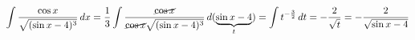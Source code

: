\documentclass[../rgr1.tex]{subfiles}
\begin{document}
\Solution

\begin{dmath}
	\int \frac{\cos x}{\sqrt{(\sin x-4)^3}} \, dx =
	\frac{1}{3} \int \frac{\cancel{\cos x}}{\cancel{\cos x}\sqrt{(\sin x-4)^3}} \, d(\underbrace{\sin x-4}_t) =
	\int t^{-\frac{3}{2}} \, dt =
	-\frac{2}{\sqrt t} =
	-\frac{2}{\sqrt{\sin x-4}}
\end{dmath}

\end{document}
